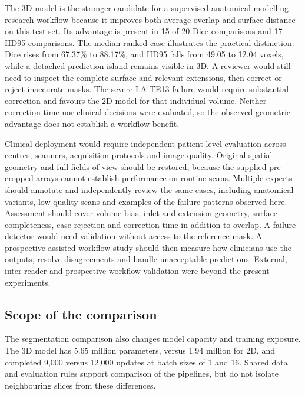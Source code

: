 \documentclass[11pt,a4paper]{article}
\begin{document}
The 3D model is the stronger candidate for a supervised anatomical-modelling research workflow because it improves both average overlap and surface distance on this test set. Its advantage is present in 15 of 20 Dice comparisons and 17 HD95 comparisons. The median-ranked case illustrates the practical distinction: Dice rises from 67.37\% to 88.17\%, and HD95 falls from 49.05 to 12.04 voxels, while a detached prediction island remains visible in 3D. A reviewer would still need to inspect the complete surface and relevant extensions, then correct or reject inaccurate masks. The severe LA-TE13 failure would require substantial correction and favours the 2D model for that individual volume. Neither correction time nor clinical decisions were evaluated, so the observed geometric advantage does not establish a workflow benefit.



Clinical deployment would require independent patient-level evaluation across centres, scanners, acquisition protocols and image quality. Original spatial geometry and full fields of view should be restored, because the supplied pre-cropped arrays cannot establish performance on routine scans. Multiple experts should annotate and independently review the same cases, including anatomical variants, low-quality scans and examples of the failure patterns observed here. Assessment should cover volume bias, inlet and extension geometry, surface completeness, case rejection and correction time in addition to overlap. A failure detector would need validation without access to the reference mask. A prospective assisted-workflow study should then measure how clinicians use the outputs, resolve disagreements and handle unacceptable predictions. External, inter-reader and prospective workflow validation were beyond the present experiments.



\subsection*{Scope of the comparison}

The segmentation comparison also changes model capacity and training exposure. The 3D model has 5.65 million parameters, versus 1.94 million for 2D, and completed 9,000 versus 12,000 updates at batch sizes of 1 and 16. Shared data and evaluation rules support comparison of the pipelines, but do not isolate neighbouring slices from these differences.
\end{document}
